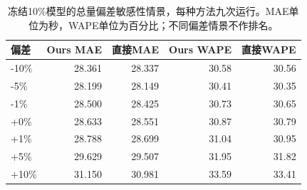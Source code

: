 \begin{table}[t]
\centering\footnotesize\setlength{\tabcolsep}{4pt}
\caption{冻结10\%模型的总量偏差敏感性情景，每种方法九次运行。MAE单位为秒，WAPE单位为百分比；不同偏差情景不作排名。}\label{tab:stress}
\begin{tabular}{lrrrr}\toprule
偏差 & Ours MAE & 直接MAE & Ours WAPE & 直接WAPE\\\midrule
-10\% & 28.361 & 28.337 & 30.58 & 30.56\\
-5\% & 28.199 & 28.149 & 30.41 & 30.35\\
-1\% & 28.500 & 28.425 & 30.73 & 30.65\\
+0\% & 28.633 & 28.551 & 30.87 & 30.79\\
+1\% & 28.788 & 28.699 & 31.04 & 30.95\\
+5\% & 29.629 & 29.507 & 31.95 & 31.82\\
+10\% & 31.150 & 30.981 & 33.59 & 33.41\\
\bottomrule\end{tabular}
\end{table}
